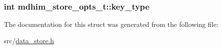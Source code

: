 \hypertarget{structmdhim__store__opts__t_ae199c9a5bce7a85d67921eb57a5a7fe4}{
\subsubsection[{key\-\_\-type}]{\setlength{\rightskip}{0pt plus 5cm}int mdhim\-\_\-store\-\_\-opts\-\_\-t\-::key\-\_\-type}}\label{structmdhim__store__opts__t_ae199c9a5bce7a85d67921eb57a5a7fe4}


The documentation for this struct was generated from the following file\-:\begin{DoxyCompactItemize}
\item 
src/\hyperlink{data__store_8h}{data\-\_\-store.\-h}\end{DoxyCompactItemize}
